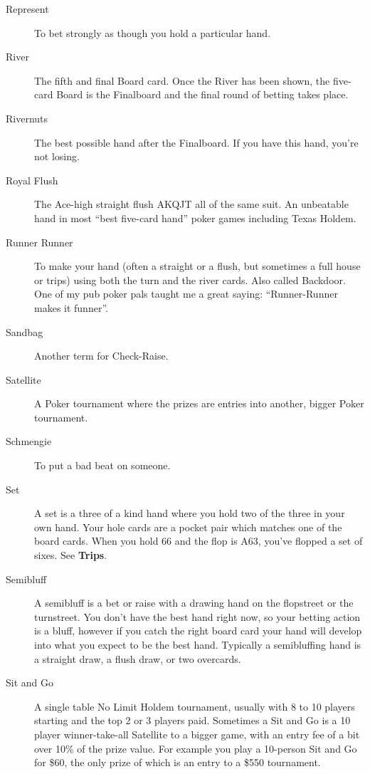 \begin{description}
\item[Represent] To bet strongly as though you hold a particular hand.

\item[River] The fifth and final Board card. Once the River has been
shown, the five-card Board is the Finalboard and the final round of
betting takes place.

\item[Rivernuts] The best possible hand after the Finalboard. If
you have this hand, you're not losing.

\item[Royal Flush] The Ace-high straight flush AKQJT all of the same
suit. An unbeatable hand in most ``best five-card hand'' poker games
including Texas Holdem.

\item[Runner Runner] To make your hand (often a straight or a flush,
but sometimes a full house or trips) using both the turn and the
river cards. Also called Backdoor. One of my pub poker pals taught me
a great saying: ``Runner-Runner makes it funner''.

\item[Sandbag] Another term for Check-Raise.

\item[Satellite] A Poker tournament where the prizes are entries into
another, bigger Poker tournament.

\item[Schmengie] To put a bad beat on someone.

\item[Set] A set is a three of a kind hand where you hold two of the
three in your own hand. Your hole cards are a pocket pair which
matches one of the board cards. When you hold 66 and the flop is A63,
you've flopped a set of sixes. See \textbf{Trips}.

\item[Semibluff] A semibluff is a bet or raise with a drawing hand on
the flopstreet or the turnstreet. You don't have the best hand right
now, so your betting action is a bluff, however if you catch the right
board card your hand will develop into what you expect to be the best
hand. Typically a semibluffing hand is a straight draw, a flush draw,
or two overcards.

\item[Sit and Go] A single table No Limit Holdem tournament, usually
with 8 to 10 players starting and the top 2 or 3 players
paid. Sometimes a Sit and Go is a 10 player winner-take-all
Satellite to a bigger game, with an entry fee of a
bit over 10\% of the prize value. For example you play a 10-person
Sit and Go for \$60, the only prize of which is an entry to a \$550
tournament.


\end{description}
